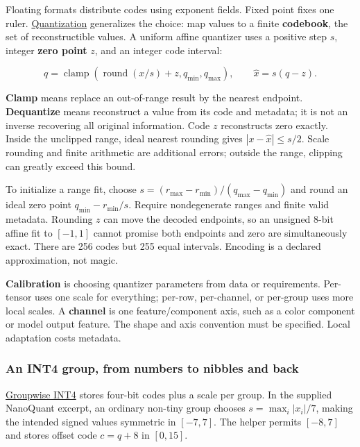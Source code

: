 Floating formats distribute codes using exponent fields. Fixed point fixes one ruler. \hyperref[appendix-d5da3eaabaef]{Quantization} generalizes the choice: map values to a finite \textbf{codebook}, the set of reconstructible values. A uniform affine quantizer uses a positive step \(s\), integer \textbf{zero point} \(z\), and an integer code interval:

\[
q=\operatorname{clamp}\!\left(\operatorname{round}(x/s)+z,q_{\min},q_{\max}\right),
\qquad
\widehat x=s(q-z).
\]

\textbf{Clamp} means replace an out-of-range result by the nearest endpoint. \textbf{Dequantize} means reconstruct a value from its code and metadata; it is not an inverse recovering all original information. Code \(z\) reconstructs zero exactly. Inside the unclipped range, ideal nearest rounding gives \(|x-\widehat x|\le s/2\). Scale rounding and finite arithmetic are additional errors; outside the range, clipping can greatly exceed this bound.

To initialize a range fit, choose \(s=(r_{\max}-r_{\min})/(q_{\max}-q_{\min})\) and round an ideal zero point \(q_{\min}-r_{\min}/s\). Require nondegenerate ranges and finite valid metadata. Rounding \(z\) can move the decoded endpoints, so an unsigned 8-bit affine fit to \([-1,1]\) cannot promise both endpoints and zero are simultaneously exact. There are 256 codes but 255 equal intervals. Encoding is a declared approximation, not magic.

\textbf{Calibration} is choosing quantizer parameters from data or requirements. Per-tensor uses one scale for everything; per-row, per-channel, or per-group uses more local scales. A \textbf{channel} is one feature/component axis, such as a color component or model output feature. The shape and axis convention must be specified. Local adaptation costs metadata.

\subsubsection{An INT4 group, from numbers to nibbles and back}\label{05-engine-i-ch001-an-int4-group-from-numbers-to-nibbles-and-back}

\hyperref[appendix-638204c40e8b]{Groupwise INT4} stores four-bit codes plus a scale per group. In the supplied NanoQuant excerpt, an ordinary non-tiny group chooses \(s=\max_i|x_i|/7\), making the intended signed values symmetric in \([-7,7]\). The helper permits \([-8,7]\) and stores offset code \(c=q+8\) in \([0,15]\).

